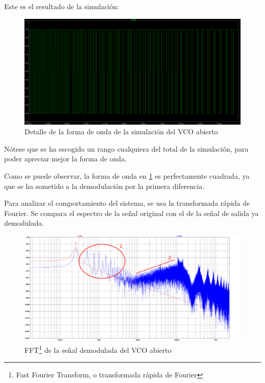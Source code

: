 \documentclass[12pt]{report} %
\begin{document}
	Este es el resultado de la simulación:
	
	\begin{figure}[H]
		\includegraphics[width=\textwidth]{vco-open-first-diff-waveform.png}
		\caption[Detalle de la forma de onda de la simulación del VCO abierto]{Detalle de la forma de onda de la simulación del VCO abierto}
		\label{fig:vco-open-first-diff-waveform.png}
	\end{figure}

	Nótese que se ha escogido un rango cualquiera del total de la simulación, para poder apreciar mejor la forma de onda.
	
	Como se puede observar, la forma de onda en \ref{fig:vco-open-first-diff-waveform.png} es perfectamente cuadrada, ya que se ha sometido a la demodulación por la primera diferencia.
	
	Para analizar el comportamiento del sistema, se usa la transformada rápida de Fourier. Se compara el espectro de la señal original con el de la señal de salida ya demodulada.
	
	\begin{figure}[H]
		\includegraphics[width=\textwidth]{vco-open-first-diff-fft-2-annotated.png}
		\caption[FFT de la señal demodulada del VCO abierto]{FFT\footnote{Fast Fourier Transform, o transformada rápida de Fourier} de la señal demodulada del VCO abierto}
		\label{fig:vco-open-first-diff-fft-2.png}
	\end{figure}
\end{document}
